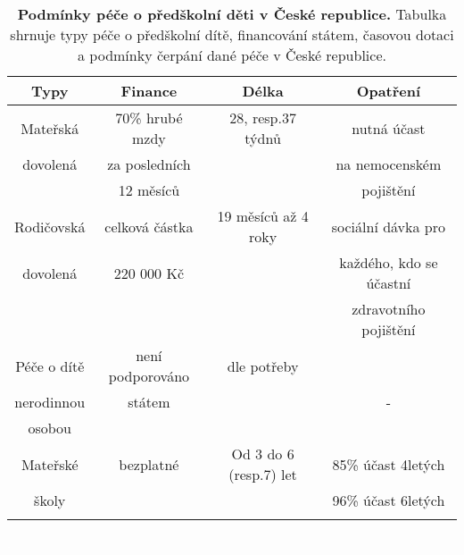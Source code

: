 \begin{spacing}{1.0}
\begin{table}[h!]
	\small
	\begin{center}
	\begin{tabular}{|c|c|c|c|}
		\hline
		\rowcolor{grey}
		\textbf{Typy}	 & \textbf{Finance}		& \textbf{Délka}		& \textbf{Opatření}	 \\
		\hline
		\hline
		Mateřská & 70\% hrubé mzdy 			& 28, resp.37 týdnů		& nutná účast  			\\ \rowcolor{grey!10}
		dovolená & za posledních	 		& 						& na nemocenském 		\\ \rowcolor{grey!10}
				 & 12 měsíců				& 						& pojištění				\\ \rowcolor{grey!10}
		\hline
		Rodičovská 	& celková částka  		& 19 měsíců až 4 roky	& sociální dávka pro 	\\ \rowcolor{grey!10}
		dovolená 	& 220 000 Kč			& 					& každého, kdo se účastní	\\ \rowcolor{grey!10}
					&						&						& zdravotního pojištění \\ \rowcolor{grey!10}
		\hline
		Péče o dítě & není podporováno		& dle potřeby			&   					\\ \rowcolor{grey!10}
		nerodinnou	& státem				&						&	-					\\ \rowcolor{grey!10}
		osobou 		&						&						&						\\ \rowcolor{grey!10}
		\hline
		Mateřské	& 	bezplatné 			& Od 3 do 6 (resp.7) let & 85\% účast 4letých 	\\ \rowcolor{grey!10}
		školy 		& 						&  						 & 96\% účast 6letých 	\\ \rowcolor{grey!10}
		\hline
	\end{tabular}
	\end{center}
	\label{tab:peceCR}
	\caption{
		\textbf{Podmínky péče o předškolní děti v České republice.}
				Tabulka shrnuje typy péče o předškolní dítě, financování státem, časovou dotaci a podmínky čerpání dané péče v České republice.
	}
\end{table}
\end{spacing}	
\vspace{10cm}
\textcolor{white}{.}


